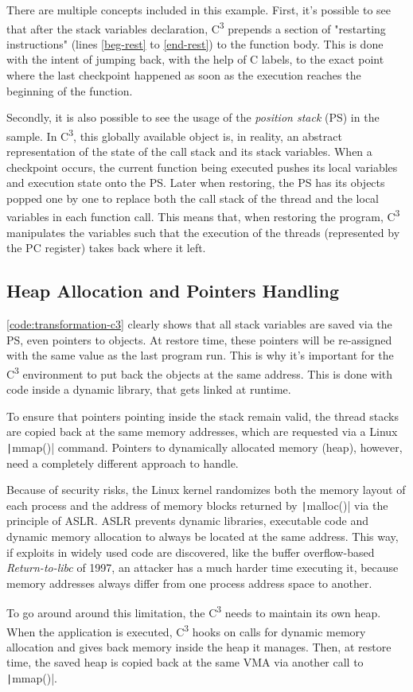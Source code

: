 There are multiple concepts included in this example. First, it's possible to see that after the stack variables declaration, C\textsuperscript{3} prepends a section of "restarting instructions" (lines \ref{beg-rest} to \ref{end-rest}) to the function body. This is done with the intent of jumping back, with the help of C labels, to the exact point where the last checkpoint happened as soon as the execution reaches the beginning of the function. 

Secondly, it is also possible to see the usage of the \textit{position stack} (PS) in the sample. In C\textsuperscript{3}, this globally available object is, in reality, an abstract representation of the state of the call stack and its stack variables. When a checkpoint occurs, the current function being executed pushes its local variables and execution state onto the PS. Later when restoring, the PS has its objects popped one by one to replace both the call stack of the thread and the local variables in each function call. This means that, when restoring the program, C\textsuperscript{3} manipulates the variables such that the execution of the threads (represented by the \gls{PC} register) takes back where it left.

\subsection*{Heap Allocation and Pointers Handling}
\autoref{code:transformation-c3} clearly shows that all stack variables are saved via the PS, even pointers to objects. At restore time, these pointers will be re-assigned with the same value as the last program run. This is why it's important for the C\textsuperscript{3} environment to put back the objects at the same address. This is done with code inside a dynamic library, that gets linked at runtime. 

To ensure that pointers pointing inside the stack remain valid, the thread stacks are copied back at the same memory addresses, which are requested via a Linux \texttt|mmap()| command. Pointers to dynamically allocated memory (heap), however, need a completely different approach to handle. 

Because of security risks, the Linux kernel randomizes both the memory layout of each process and the address of memory blocks returned by \texttt|malloc()| via the principle of \gls{ASLR}. ASLR prevents dynamic libraries, executable code and dynamic memory allocation to always be located at the same address. This way, if exploits in widely used code are discovered, like the buffer overflow-based \textit{Return-to-libc} of 1997\cite{online:libc-attack}, an attacker has a much harder time executing it, because memory addresses always differ from one process address space to another.

To go around around this limitation, the C\textsuperscript{3} needs to maintain its own heap. When the application is executed, C\textsuperscript{3} hooks on calls for dynamic memory allocation and gives back memory inside the heap it manages. Then, at restore time, the saved heap is copied back at the same \gls{VMA} via another call to \texttt|mmap()|.
